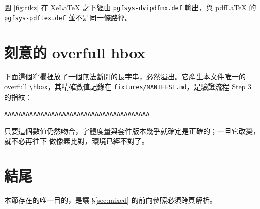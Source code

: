 \documentclass[11pt, a4paper]{article}
\begin{document}
圖 \ref{fig:tikz} 在 XeLaTeX 之下經由 \texttt{pgfsys-dvipdfmx.def} 輸出，與 pdfLaTeX
的 \texttt{pgfsys-pdftex.def} 並不是同一條路徑。

\section{刻意的 overfull hbox}\label{sec:overfull}
下面這個窄欄裡放了一個無法斷開的長字串，必然溢出。它產生本文件唯一的 overfull
\verb|\hbox|，其精確數值記錄在 \texttt{fixtures/MANIFEST.md}，是驗證流程 Step 3 的指紋：

\noindent\begin{minipage}{0.30\textwidth}
\texttt{AAAAAAAAAAAAAAAAAAAAAAAAAAAAAAAAAAAAAAAA}
\end{minipage}

只要這個數值仍然吻合，字體度量與套件版本幾乎就確定是正確的；一旦它改變，就不必再往下
做像素比對，環境已經不對了。

\section{結尾}\label{sec:last}
本節存在的唯一目的，是讓 \S\ref{sec:mixed} 的前向參照必須跨頁解析。
\end{document}
